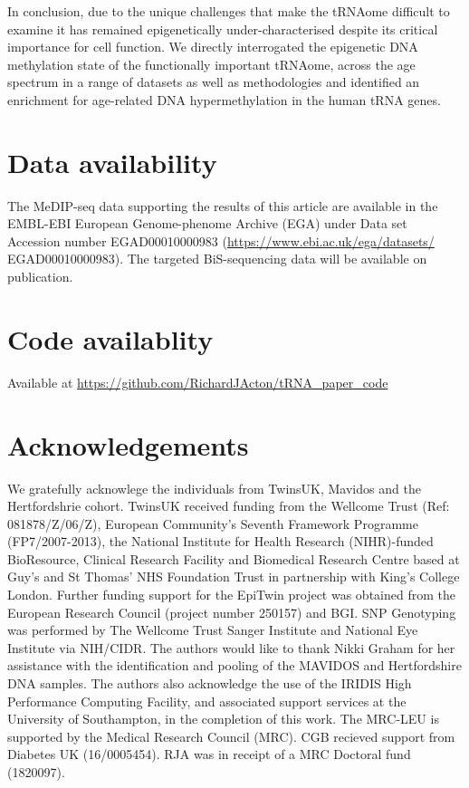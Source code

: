 \documentclass[]{book}
\begin{document}
In conclusion, due to the unique challenges that make the tRNAome difficult to examine it has remained epigenetically under-characterised despite its critical importance for cell function.
We directly interrogated the epigenetic DNA methylation state of the functionally important tRNAome, across the age spectrum in a range of datasets as well as methodologies and identified an enrichment for age-related DNA hypermethylation in the human tRNA genes.

\newpage

\hypertarget{data-availability}{%
\section{Data availability}\label{data-availability}}

The MeDIP-seq data supporting the results of this article are available in the EMBL-EBI European Genome-phenome Archive (EGA) under Data set Accession number EGAD00010000983 (\url{https://www.ebi.ac.uk/ega/datasets/}
EGAD00010000983).
The targeted BiS-sequencing data will be available on publication.

\hypertarget{code-availablity}{%
\section{Code availablity}\label{code-availablity}}

Available at \url{https://github.com/RichardJActon/tRNA_paper_code}

\newpage

\hypertarget{acknowledgements-1}{%
\section{Acknowledgements}\label{acknowledgements-1}}

We gratefully acknowlege the individuals from TwinsUK, Mavidos and the Hertfordshrie cohort.
TwinsUK received funding from the Wellcome Trust (Ref: 081878/Z/06/Z), European Community's Seventh Framework Programme (FP7/2007-2013), the National Institute for Health Research (NIHR)-funded BioResource, Clinical Research Facility and Biomedical Research Centre based at Guy's and St Thomas' NHS Foundation Trust in partnership with King's College London.
Further funding support for the EpiTwin project was obtained from the European Research Council (project number 250157) and BGI.
SNP Genotyping was performed by The Wellcome Trust Sanger Institute and National Eye Institute via NIH/CIDR.
The authors would like to thank Nikki Graham for her assistance with the identification and pooling of the MAVIDOS and Hertfordshire DNA samples.
The authors also acknowledge the use of the IRIDIS High Performance Computing Facility, and associated support services at the University of Southampton, in the completion of this work.
The MRC-LEU is supported by the Medical Research Council (MRC).
CGB recieved support from Diabetes UK (16/0005454).
RJA was in receipt of a MRC Doctoral fund (1820097).
\end{document}
